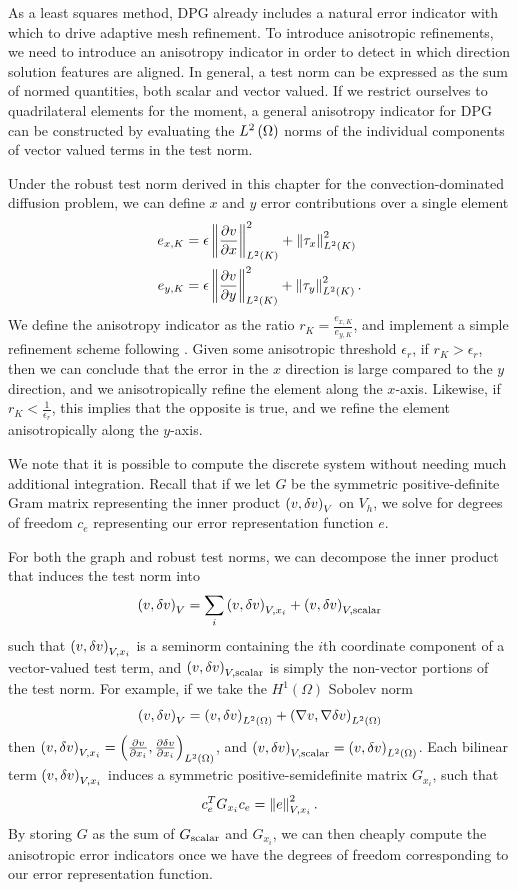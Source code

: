 As a least squares method, DPG already includes a natural error indicator with which to drive adaptive mesh refinement.  To introduce anisotropic refinements, we need to introduce an anisotropy indicator in order to detect in which direction solution features are aligned.  In general, a test norm can be expressed as the sum of normed quantities, both scalar and vector valued.  If we restrict ourselves to quadrilateral elements for the moment, a general anisotropy indicator for DPG can be constructed by evaluating the $\L$ norms of the individual components of vector valued terms in the test norm.  

Under the robust test norm derived in this chapter for the convection-dominated diffusion problem, we can define $x$ and $y$ error contributions over a single element
\begin{align*}
e_{x,K} &= \epsilon \nor{\pd{v}{x}}_{L^2(K)}^2 + \nor{\tau_x}_{L^2(K)}^2 \\
e_{y,K} &= \epsilon \nor{\pd{v}{y}}_{L^2(K)}^2 + \nor{\tau_y}_{L^2(K)}^2.
\end{align*}
We define the anisotropy indicator as the ratio $r_K = \frac{e_{x,K}}{e_{y,K}}$, and implement a simple refinement scheme following \cite{DPG3}.  Given some anisotropic threshold $\epsilon_r$, if $r_K>\epsilon_r$, then we can conclude that the error in the $x$ direction is large compared to the $y$ direction, and we anisotropically refine the element along the $x$-axis.  Likewise, if $r_K < \frac{1}{\epsilon_r}$, this implies that the opposite is true, and we refine the element anisotropically along the $y$-axis.  

We note that it is possible to compute the discrete system without needing much additional integration.  Recall that if we let $G$ be the symmetric positive-definite Gram matrix representing the inner product $\LRp{v,\delta v}_V$ on $V_h$, we solve for degrees of freedom $c_e$ representing our error representation function $e$.  

For both the graph and robust test norms, we can decompose the inner product that induces the test norm into 
\[
\LRp{v,\delta v}_V = \sum_i \LRp{v,\delta v}_{V,x_i} + \LRp{v,\delta v}_{V,{\rm scalar}}
\]
such that $\LRp{v,\delta v}_{V,x_i}$ is a seminorm containing the $i$th coordinate component of a vector-valued test term, and $\LRp{v,\delta v}_{V,{\rm scalar}}$ is simply the non-vector portions of the test norm.  For example, if we take the $H^1(\Omega)$ Sobolev norm
\[
\LRp{v,\delta v}_V = \LRp{v,\delta v}_{\L} + \LRp{\grad v,\grad \delta v}_{\L}
\]
then $\LRp{v,\delta v}_{V,x_i} = \LRp{\pd{v}{x_i},\pd{\delta v}{x_i}}_{\L}$, and $\LRp{v,\delta v}_{V,{\rm scalar}} = \LRp{v,\delta v}_{\L}$.  Each bilinear term $\LRp{v,\delta v}_{V,x_i}$ induces a symmetric positive-semidefinite matrix $G_{x_i}$, such that 
\[
c_e^TG_{x_i}c_e = \nor{e}^2_{V,x_i}.
\]
By storing $G$ as the sum of $G_{\rm scalar}$ and $G_{x_i}$, we can then cheaply compute the anisotropic error indicators once we have the degrees of freedom corresponding to our error representation function.  



